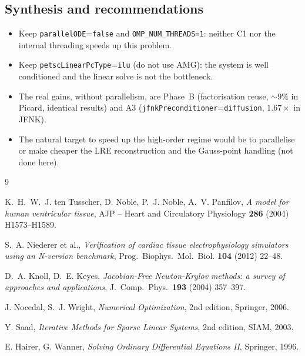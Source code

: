 \documentclass[11pt,a4paper]{article}
\newcommand{\code}[1]{\texttt{\small #1}}
\newcommand{\dictkey}[1]{\textcolor{black!60!green}{\texttt{\footnotesize #1}}}
\begin{document}
\subsection{Synthesis and recommendations}
\label{sec:exp-sintesis}

\begin{itemize}[nosep]
  \item Keep \dictkey{parallelODE}=\code{false} and \code{OMP\_NUM\_THREADS=1}:
        neither C1 nor the internal threading speeds up this problem.
  \item Keep \dictkey{petscLinearPcType}=\code{ilu} (do not use AMG): the system
        is well conditioned and the linear solve is not the bottleneck.
  \item The real gains, without parallelism, are Phase~B
        (factorisation reuse, $\sim 9\%$ in Picard, identical
        results) and A3 (\dictkey{jfnkPreconditioner}=\code{diffusion},
        $1.67\times$ in JFNK).
  \item The natural target to speed up the high-order regime would be to parallelise
        or make cheaper the LRE reconstruction and the Gauss-point handling (not
        done here).
\end{itemize}

\begin{thebibliography}{9}

 K.~H.~W.~J. ten Tusscher, D. Noble, P.~J. Noble, A.~V.
    Panfilov, \emph{A model for human ventricular tissue},
    AJP -- Heart and Circulatory Physiology
    \textbf{286} (2004) H1573--H1589.

 S.~A. Niederer et al.,
    \emph{Verification of cardiac tissue electrophysiology simulators
    using an N-version benchmark}, Prog.\ Biophys.\ Mol.\ Biol.
    \textbf{104} (2012) 22--48.

 D.~A. Knoll, D.~E. Keyes,
    \emph{Jacobian-Free Newton-Krylov methods: a survey of approaches
    and applications}, J.\ Comp.\ Phys.\ \textbf{193}
    (2004) 357--397.

 J. Nocedal, S.~J. Wright,
    \emph{Numerical Optimization}, 2nd edition, Springer, 2006.

 Y. Saad,
    \emph{Iterative Methods for Sparse Linear Systems}, 2nd edition,
    SIAM, 2003.

 E. Hairer, G. Wanner,
    \emph{Solving Ordinary Differential Equations II}, Springer, 1996.

\end{thebibliography}
\end{document}
